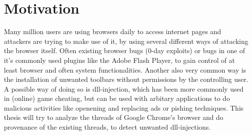 \section{Motivation}

Many million users are using browsers daily to access internet pages and attackers are trying to make use of it, by using several different ways of attacking the browser itself. Often existing browser bugs (0-day exploits) or bugs in one of it's commonly used plugins like the Adobe Flash Player, to gain control of at least browser and often system functionalities. Another also very common way is the installation of unwanted toolbars without permissions by the controlling user. A possible way of doing so is dll-injection, which has been more commonly used in (online) game cheating, but can be used with arbitary applications to do malicious activities like openening and replacing ads or pishing techniques. This thesis will try to analyze the threads of Google Chrome's browser and do provenance of the existing threads, to detect unwanted dll-injections.
